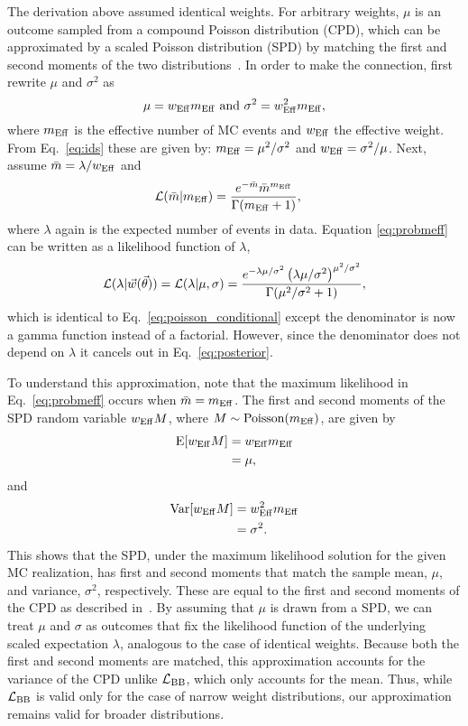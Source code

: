 The derivation above assumed identical weights. For arbitrary weights, $\mu$ is an outcome sampled from a compound Poisson distribution (CPD), which can be approximated by a scaled Poisson distribution (SPD) by matching the first and second moments of the two distributions~\cite{Bohm:2013gla}. In order to make the connection, first rewrite $\mu$ and $\sigma^2$ as
\begin{equation}\label{eq:effparameters}
\mu= w_\mathrm{Eff} m_\mathrm{Eff}~\textmd{and}~\sigma^2 = w_\mathrm{Eff}^2 m_\mathrm{Eff},
\end{equation}
where $m_\mathrm{Eff}$ is the effective number of MC events and $w_\mathrm{Eff}$ the effective weight. From Eq.~\eqref{eq:ids} these are given by: $m_\mathrm{Eff} = \mu^2/\sigma^2$ and $w_\mathrm{Eff}=\sigma^2/\mu$. Next, assume $\bar m = \lambda/w_\mathrm{Eff}$ and
\begin{align}
\label{eq:probmeff}
\mathcal{L}(\bar m|m_\mathrm{Eff})&= \frac{e^{-\bar m}{\bar m}^{m_\mathrm{Eff}}}{\Gamma(m_\mathrm{Eff}+1)},
\end{align}
where $\lambda$ again is the expected number of events in data. Equation \eqref{eq:probmeff} can be written as a likelihood function of $\lambda$,
\begin{equation}
\mathcal{L}(\lambda|\vec{w}(\vec{\theta}))=\mathcal{L}(\lambda|\mu, \sigma)=\frac{e^{-\lambda\mu/\sigma^2}\left(\lambda\mu/\sigma^2\right)^{\mu^2/\sigma^2}}{\Gamma(\mu^2/\sigma^2+1)},
\label{eq:poisson_conditional_arb}
\end{equation}
which is identical to Eq.~\eqref{eq:poisson_conditional} except the denominator is now a gamma function instead of a factorial. However, since the denominator does not depend on $\lambda$ it cancels out in Eq.~\eqref{eq:posterior}.

To understand this approximation, note that the maximum likelihood in Eq.~\eqref{eq:probmeff} occurs when $\bar m = m_\mathrm{Eff}$. The first and second moments of the SPD random variable $w_\mathrm{Eff} M$, where $M \sim \mathrm{Poisson}(m_\mathrm{Eff})$, are given by
\begin{align}
\mathrm{E}[w_\mathrm{Eff} M] &= w_\mathrm{Eff} m_\mathrm{Eff} \\
&= \mu, \nonumber
\end{align}
and
\begin{align}
\mathrm{Var}[w_\mathrm{Eff} M] &= w_\mathrm{Eff}^2 m_\mathrm{Eff} \\
&= \sigma^2. \nonumber
\end{align}
This shows that the SPD, under the maximum likelihood solution for the given MC realization, has first and second moments that match the sample mean, $\mu$, and variance, $\sigma^2$, respectively. These are equal to the first and second moments of the CPD as described in~\cite{Bohm:2013gla}. By assuming that $\mu$ is drawn from a SPD, we can treat $\mu$ and $\sigma$ as outcomes that fix the likelihood function of the underlying scaled expectation $\lambda$, analogous to the case of identical weights. Because both the first and second moments are matched, this approximation accounts for the variance of the CPD unlike $\mathcal{L}_{\textmd{BB}}$, which only accounts for the mean. Thus, while $\mathcal{L}_{\textmd{BB}}$ is valid only for the case of narrow weight distributions, our approximation remains valid for broader distributions.
